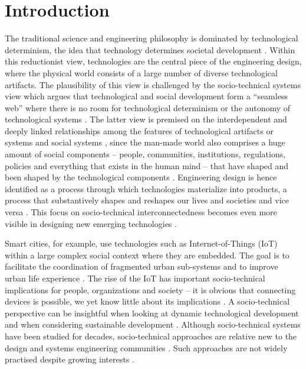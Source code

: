 \section{Introduction}
\label{sec:intro}

The traditional science and engineering philosophy is dominated by technological determinism, the idea that technology determines societal development \cite{Mody2006,Sawyer2014,Smith1994}. Within this reductionist view, technologies are the central piece of the engineering design, where the physical world consists of a large number of diverse technological artifacts. 
The plausibility of this view is challenged by the socio-technical systems view \cite{VanDam2012} which argues that technological and social development form a ``seamless web'' where there is no room for technological determinism or the autonomy of technological systems \cite{Fleischhacker2004}. 
%
The latter view is premised on the interdependent and deeply linked relationships among the features of technological artifacts or systems and social systems \cite{Sawyer2014}, since the man-made world also comprises a huge amount of social components -- people, communities, institutions, regulations, policies and everything that exists in the human mind -- that have shaped and been shaped by the technological components \cite{Harari2014,VanDam2012}. 
Engineering design is hence identified as a process through which technologies materialize into products, a process that substantively  shapes  and  reshapes  our  lives  and   societies and vice versa \cite{Kroes2008}. This focus on socio-technical interconnectedness becomes even  more  visible in designing new emerging technologies \cite{Kroes2008}.  

Smart cities, for example, use technologies such as Internet-of-Things (IoT) within a large complex social context where they are embedded. The goal is to facilitate the coordination of fragmented urban sub-systems and to improve urban  life experience \cite{Glasmeier2015}. 
% 
The rise of the IoT has important socio-technical implications for people, organizations and society -- it is obvious that connecting devices is possible, we yet know little about its implications \cite{Shin2014}. A socio-technical perspective can be insightful when looking at dynamic technological development and when considering sustainable development \cite{Shin2014}. Although socio-technical systems have been studied for decades, socio-technical approaches are relative new to the design and systems engineering communities \cite{Baxter2011,Norman2015,Sawyer2014}. Such approaches are not widely practised despite growing interests \cite{Baxter2011}. %

